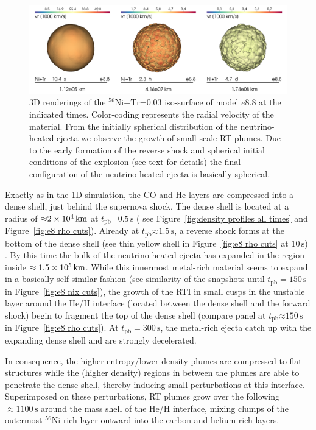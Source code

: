 \documentclass[fleqn,usenatbib]{mnras}
\newcommand{\tpb}{\ensuremath{t_{\text{pb}}}}
\newcommand{\nickel}{\ensuremath{\mathrm{^{56}Ni}}\xspace}
\newcommand{\tracer}{\ensuremath{\mathrm{Tr}}\xspace}
\newcommand{\s}{\ensuremath{\text{s}}}
\begin{document}
\begin{figure}%
\includegraphics[width=\textwidth]{pic/e8_tile_1_3.png}
    \caption{3D renderings of the $\nickel\mathord{+}\tracer\mathord{=}0.03$ 
             iso-surface of model $e8.8$ at the indicated times. Color-coding represents the radial velocity of the material. From the initially spherical distribution of the neutrino-heated ejecta we observe the growth of small scale RT plumes. Due to the early formation of the reverse shock and spherical initial conditions of the explosion (see text for details) the final configuration of the neutrino-heated ejecta is basically spherical. }
\label{fig:e8 3d rendering}
\end{figure}%


Exactly as in the 1D simulation, the CO and He layers are compressed into a dense shell,
just behind the supernova shock. The dense shell is located at a radius of 
$\mathord{\approx}2\times 10^4\,\rm km$ at $\tpb\mathord{=}0.5\,\s$ (
see Figure~\ref{fig:density profiles all times} and Figure~\ref{fig:e8 rho cuts}).
Already at $\tpb\mathord{\approx}1.5\,\s$, a reverse shock forms at the bottom 
of the dense shell (see thin yellow shell in Figure~\ref{fig:e8 rho cuts} at $10\,\s$) .
By this time the bulk of the neutrino-heated ejecta has expanded in the region
inside $\approx 1.5\times 10^5\,\rm km$.
While this innermost metal-rich material seems to expand in a basically self-similar fashion
(see similarity of the snapshots until $\tpb=150\,\s$ in Figure~\ref{fig:e8 nix cuts}),
the growth of the RTI in small cusps in the unstable layer around the He/H interface 
(located between the dense shell and the forward shock) begin to fragment the top of 
the dense shell (compare panel at $\tpb\mathord{\approx} 150\,\s $ in Figure~\ref{fig:e8 rho cuts}). At $\tpb=300\,\s$,
the metal-rich ejecta catch up with the expanding dense shell and are strongly decelerated.

In consequence, the higher entropy/lower density plumes are compressed to flat
structures while the (higher density) regions in between the plumes are able 
to penetrate the dense shell, thereby inducing small perturbations at this interface. 
Superimposed on these perturbations, RT plumes grow over the following $\approx 1100\,\s$ 
around the mass shell of the He/H interface, mixing clumps of the outermost 
\nickel-rich layer outward into the carbon and helium rich layers.
\end{document}
